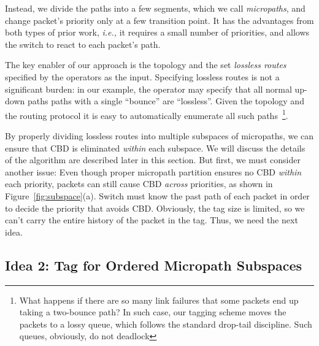 Instead, we divide the paths into a few segments, which we call {\em micropaths},
and change packet's priority only at a few transition point. It has the
advantages from both types of prior work, {\em i.e.,} it requires a small number
of priorities, and allows the switch to react to each packet's path.

The key enabler of our approach is the topology and the set {\em lossless
routes} specified by the operators as the input. Specifying lossless routes is
not a significant burden: in our example, the operator may specify that all
normal up-down paths paths with a single ``bounce'' are ``lossless''. Given the
topology and the routing protocol it is easy to automatically enumerate all such
paths~\footnote{What happens if there are so many link failures that some
packets end up taking a two-bounce path? In such case, our tagging scheme moves
the packets to a lossy queue, which follows the standard drop-tail discipline.
Such queues, obviously, do not deadlock}. 

By properly dividing lossless routes into multiple subspaces of micropaths, we
can ensure that CBD is eliminated {\em within} each subspace. We will discuss
the details of the algorithm are described later in this section. But first, we
must consider another issue: Even though proper micropath partition ensures no
CBD {\em within} each priority, packets can still cause CBD {\em across}
priorities, as shown in Figure~\ref{fig:subspace}(a). Switch must know the past
path of each packet in order to decide the priority that avoids CBD. Obviously,
the tag size is limited, so we can't carry the entire history of the packet in
the tag. Thus, we need the next idea.


\subsection{Idea 2: Tag for Ordered Micropath Subspaces}\label{sec:tag_order}

